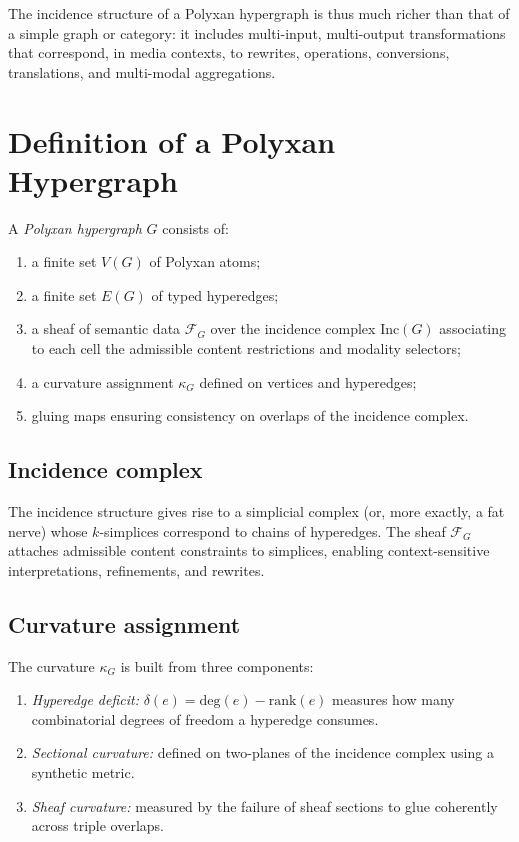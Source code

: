 The incidence structure of a Polyxan hypergraph is thus much richer than that of
a simple graph or category: it includes multi-input, multi-output transformations
that correspond, in media contexts, to rewrites, operations, conversions,
translations, and multi-modal aggregations.

\section{Definition of a Polyxan Hypergraph}

\begin{definition}
A \emph{Polyxan hypergraph} $G$ consists of:
\begin{enumerate}
  \item a finite set $V(G)$ of Polyxan atoms;
  \item a finite set $E(G)$ of typed hyperedges;
  \item a sheaf of semantic data $\mathscr{F}_G$ over the incidence complex
        $\mathrm{Inc}(G)$ associating to each cell the admissible content
        restrictions and modality selectors;
  \item a curvature assignment $\kappa_G$ defined on vertices and hyperedges;
  \item gluing maps ensuring consistency on overlaps of the incidence complex.
\end{enumerate}
\end{definition}

\subsection{Incidence complex}

The incidence structure gives rise to a simplicial complex (or, more exactly, a
fat nerve) whose $k$-simplices correspond to chains of hyperedges.  The sheaf
$\mathscr{F}_G$ attaches admissible content constraints to simplices, enabling
context-sensitive interpretations, refinements, and rewrites.

\subsection{Curvature assignment}

The curvature $\kappa_G$ is built from three components:

\begin{enumerate}
  \item \emph{Hyperedge deficit:}  
        $\delta(e) = \mathrm{deg}(e) - \mathrm{rank}(e)$ measures how many
        combinatorial degrees of freedom a hyperedge consumes.
  \item \emph{Sectional curvature:}  
        defined on two-planes of the incidence complex using a synthetic metric.
  \item \emph{Sheaf curvature:}  
        measured by the failure of sheaf sections to glue coherently across
        triple overlaps.
\end{enumerate}

